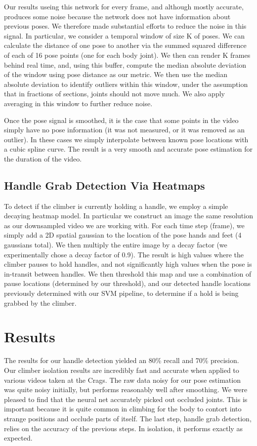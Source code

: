 \documentclass{chi2009}
\begin{document}
Our results useing this network for every frame, and although mostly accurate, produces some noise because the network does not have information about previous poses. We therefore made substantial efforts to reduce the noise in this signal. In particular, we consider a temporal
window of size K of poses. We can calculate the distance of one pose to another via the summed squared difference of each of 16 pose points (one for each body joint). We then can render K frames behind real time, and, using this buffer, compute the median absolute deviation of the window using pose distance as our metric. We then use the median absolute deviation to identify outliers within this window, under the assumption that in fractions of sections, joints should not move much. We also apply averaging in this window to further reduce noise.

Once the pose signal is smoothed, it is the case that some points in the video simply have no pose information (it was not measured, or it was removed as an outlier). In these cases we simply interpolate between known pose locations with a cubic spline curve. The result is a very smooth and accurate pose estimation for the duration of the video.

\subsection{Handle Grab Detection Via Heatmaps}

To detect if the climber is currently holding a handle, we employ a simple decaying heatmap model. In particular we construct an image the same resolution as our downsampled video we are working with. For each time step (frame), we simply add a 2D spatial gaussian to the location of the pose hands and feet (4 gaussians total). We then multiply the entire image by a decay factor (we experimentally chose a decay factor of 0.9). The result is high values where the climber pauses to hold handles, and not significantly high values when the pose is in-transit between handles. We then threshold this map and use a combination of pause locations (determined by our threshold), and our detected handle locations previously determined with our SVM pipeline, to determine if a hold is being grabbed by the climber.

\section{Results}
The results for our handle detection yielded an 80\% recall and 70\% precision. Our climber isolation results are incredibly fast and accurate when applied to various videos taken at the Crags. The raw data noisy for our pose estimation was quite noisy initially, but performs reasonably well after smoothing. We were pleased to find that the neural net accurately picked out occluded joints. This is important because it is quite common in climbing for the body to contort into strange positions and occlude parts of itself. The last step, handle grab detection, relies on the accuracy of the previous steps. In isolation, it performs exactly as expected.
\end{document}
